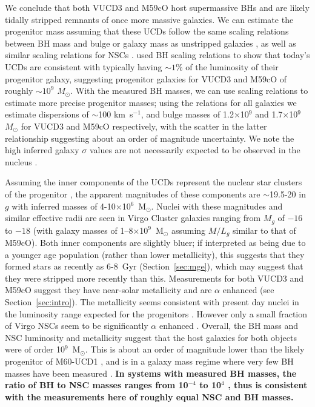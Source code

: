 \documentclass{aastex}
\begin{document}
We conclude that both VUCD3 and M59cO host supermassive BHs and are likely tidally stripped remnants of once more massive galaxies. We can estimate the progenitor mass assuming that these UCDs follow the same scaling relations between BH mass and bulge or galaxy mass as unstripped galaxies \citep[e.g.][]{kormendy13,vandenbosch16}, as well as similar scaling relations for NSCs \citep[e.g.][]{scott13,georgiev16}.
\citet{mieske13} used BH scaling relations to show that today's UCDs are consistent with typically having $\sim1$\% of the luminosity of their progenitor galaxy, suggesting progenitor galaxies for VUCD3 and M59cO of roughly $\sim 10^9$ $M_\odot$.  With the measured BH masses, we can use scaling relations to estimate more precise progenitor masses; using the \citet{saglia16} relations for all galaxies we estimate dispersions of $\sim$100 km~s$^{-1}$, and bulge masses of 1.2$\times$10$^9$ and 1.7$\times$10$^9$ $M_\odot$ for VUCD3 and M59cO respectively, with the scatter in the latter relationship suggesting about an order of magnitude uncertainty.  We note the high inferred galaxy $\sigma$ values are not necessarily expected to be observed in the nucleus \citep[e.g.][]{koleva11,feldmeier14}.  %

Assuming the inner components of the UCDs represent the nuclear star clusters of the progenitor \citep{pfeffer13}, the apparent magnitudes of these components are $\sim$19.5-20 in $g$ with inferred masses of 4-10$\times$10$^6$~M$_\odot$.  Nuclei with these magnitudes and similar effective radii are seen in Virgo Cluster galaxies ranging from $M_g$ of $-16$ to $-18$ \citep{cote06} (with galaxy masses of 1--8$\times$10$^9$~M$_\odot$ assuming $M/L_g$ similar to that of M59cO).  Both inner components are slightly bluer; if interpreted as being due to a younger age population (rather than lower metallicity), this suggests that they formed stars as recently as 6-8~Gyr (Section~\ref{sec:mge}), which may suggest that they were stripped more recently than this.  Measurements for both VUCD3 and M59cO suggest they have near-solar metallicity and are $\alpha$ enhanced (see Section~\ref{sec:intro}).  The metallicity seems consistent with present day nuclei in the luminosity range expected for the progenitors \citep{geha03,paudel11}.  However only a small fraction of Virgo NSCs seem to be significantly $\alpha$ enhanced \citep{paudel11}.  Overall, the BH mass and NSC luminosity and metallicity suggest that the host galaxies for both objects were of order 10$^9$~M$_\odot$.  This is about an order of magnitude lower than the likely progenitor of M60-UCD1 \citep{seth14}, and is in a galaxy mass regime where very few BH masses have been measured \citep{verolme02,seth10,reines13,denbrok15,nguyen16}.  {\bf In systems with measured BH masses, the ratio of BH to NSC masses  ranges from 10$^{-4}$ to 10$^4$ \citep{georgiev16}, thus is consistent with the measurements here of roughly equal NSC and BH masses.}  
\end{document}
